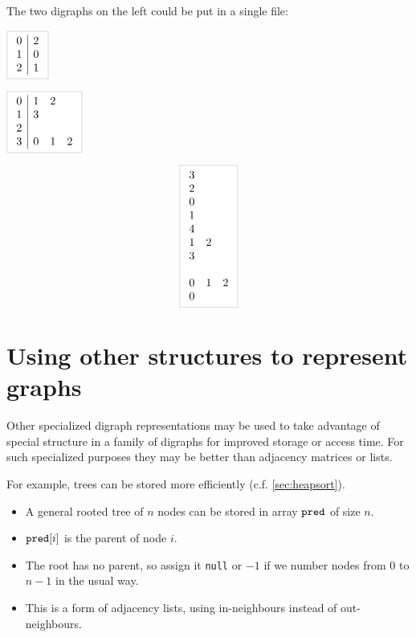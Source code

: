 \begin{Boxample} 
The two digraphs on the left could be put in a single file:\\

\begin{minipage}[c]{0.5\textwidth}
\centering
	$\lightgraybox{\begin{array}{c|c}
	0 & 2  \\
	1 & 0  \\
	2 & 1 \\
	\end{array}}$
	
	\vspace{1cm}
	$\lightgraybox{\begin{array}{c|ccc}
	0 & 1 & 2  \\
	1 & 3  \\
	2  \\
	3 & 0 & 1 & 2 \\
	\end{array}}$
\end{minipage}
\begin{minipage}[c]{0.5\textwidth}
$$
\lightgraybox{
	\begin{array}{ccc}
	3 &   &   \\
	2 &   &   \\
	0 &   &   \\
	1 &   &   \\
	4 &   &   \\
	1 & 2 &   \\
	3 &   &   \\
	  &   &   \\
	0 & 1 &  2 \\
	0 &   &   \\
	\end{array}
}
$$
\end{minipage}
\end{Boxample}


\section{Using other structures to represent graphs}
Other specialized digraph representations may be used to take advantage of
special structure in a family of digraphs for improved storage or access time. 
For such specialized purposes they may be better than adjacency matrices or lists.

For example, trees can be stored more efficiently (c.f. \cref{sec:heapsort}).  
\begin{itemize}
\item A general rooted tree of $n$ nodes can be stored in array $\operatorname{\text{\texttt{pred}}}$ of size $n$. 
\item $\operatorname{\text{\texttt{pred}}}[i]$ is the parent of node $i$. 
\item The root has no parent, so assign it \texttt{null} or $-1$ if we number nodes from $0$
to $n-1$ in the usual way. 
\item This is a form of adjacency lists, using in-neighbours instead of out-neighbours.
\end{itemize}

